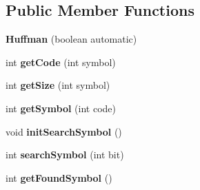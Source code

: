 \subsection*{Public Member Functions}
\begin{DoxyCompactItemize}
\item 
\mbox{\label{classdomini_1_1algorithm_1_1Huffman_ad5963e423f25e932ed78779bc000edaf}} 
{\bfseries Huffman} (boolean automatic)
\item 
\mbox{\label{classdomini_1_1algorithm_1_1Huffman_a305f26e6d42a2acf9c2c85e751a7084f}} 
int {\bfseries get\+Code} (int symbol)
\item 
\mbox{\label{classdomini_1_1algorithm_1_1Huffman_aa1d92244c3586d571825fb1799dd6331}} 
int {\bfseries get\+Size} (int symbol)
\item 
\mbox{\label{classdomini_1_1algorithm_1_1Huffman_a9b7c1f210d857e6fb380f1964c8d312b}} 
int {\bfseries get\+Symbol} (int code)
\item 
\mbox{\label{classdomini_1_1algorithm_1_1Huffman_adf2a924d37ddd0212721bb019398b3f4}} 
void {\bfseries init\+Search\+Symbol} ()
\item 
\mbox{\label{classdomini_1_1algorithm_1_1Huffman_afbfe973f057eaf88d13a26c21552bbf7}} 
int {\bfseries search\+Symbol} (int bit)
\item 
\mbox{\label{classdomini_1_1algorithm_1_1Huffman_a3f261a9daaf21109f5357d7f385a3af7}} 
int {\bfseries get\+Found\+Symbol} ()
\end{DoxyCompactItemize}

